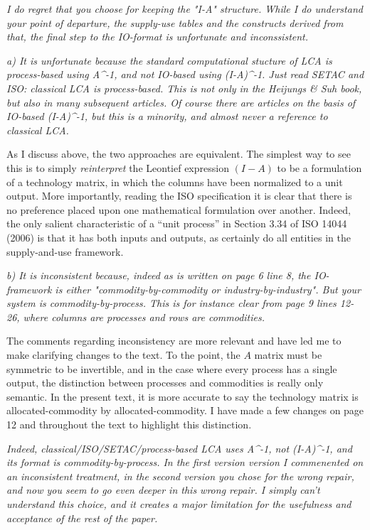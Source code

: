 \documentclass[11pt,letterpaper]{article}
\begin{document}
\emph{I do regret that you choose for keeping the "I-A" structure. While I do understand your point of departure, the supply-use tables and the constructs derived from that, the final step to the IO-format is unfortunate and inconssistent.}\par
\emph{  a) It is unfortunate because the standard computational stucture of LCA is process-based using A\^{}-1, and not IO-based using (I-A)\^{}-1. Just read SETAC and ISO: classical LCA is process-based. This is not only in the Heijungs \& Suh book, but also in many subsequent articles. Of course there are articles on the basis of IO-based (I-A)\^{}-1, but this is a minority, and almost never a reference to classical LCA.}

As I discuss above, the two approaches are equivalent.  The simplest way to see this is to simply \textit{reinterpret} the Leontief expression $(I-A)$ to be a formulation of a technology matrix, in which the columns have been normalized to a unit output.  More importantly, reading the ISO specification it is clear that there is no preference placed upon one mathematical formulation over another.  Indeed, the only salient characteristic of a ``unit process'' in Section 3.34 of ISO 14044 (2006) is that it has both inputs and outputs, as certainly do all entities in the supply-and-use framework.

\emph{b) It is inconsistent because, indeed as is written on page 6 line 8, the IO-framework is either "commodity-by-commodity or industry-by-industry". But your system  is commodity-by-process. This is for instance clear from page 9 lines 12-26, where columns are processes and rows are commodities.}

The comments regarding inconsistency are more relevant and have led me to make clarifying changes to the text. To the point, the $A$ matrix must be symmetric to be invertible, and in the case where every process has a single output, the distinction between processes and commodities is really only semantic.  In the present text, it is more accurate to say the technology matrix is allocated-commodity by allocated-commodity.  I have made a few changes on page 12 and throughout the text to highlight this distinction.

\emph{Indeed, classical/ISO/SETAC/process-based LCA uses A\^{}-1, not (I-A)\^{}-1, and its format is commodity-by-process. In the first version version I commenented on an inconsistent treatment, in the second version you chose for the wrong repair, and now you seem to go even deeper in this wrong repair. I simply can't understand this choice, and it creates a major limitation for the usefulness and acceptance of the rest of the paper.}
\end{document}
